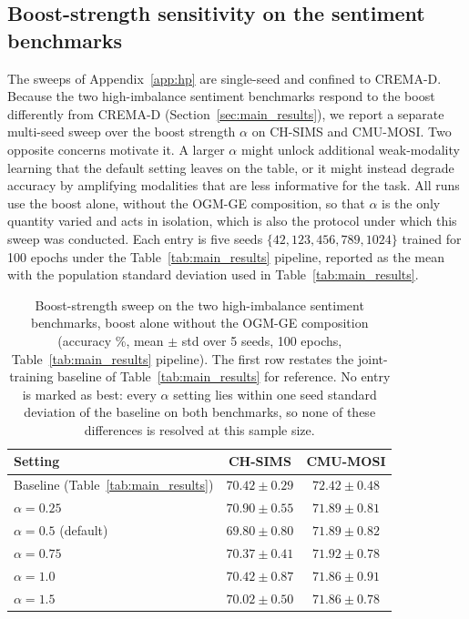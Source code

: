 \documentclass{article}
\begin{document}
\subsection{Boost-strength sensitivity on the sentiment benchmarks}
\label{app:alpha_sentiment}

The sweeps of Appendix~\ref{app:hp} are single-seed and confined to CREMA-D. Because the two high-imbalance sentiment benchmarks respond to the boost differently from CREMA-D (Section~\ref{sec:main_results}), we report a separate multi-seed sweep over the boost strength $\alpha$ on CH-SIMS and CMU-MOSI. Two opposite concerns motivate it. A larger $\alpha$ might unlock additional weak-modality learning that the default setting leaves on the table, or it might instead degrade accuracy by amplifying modalities that are less informative for the task. All runs use the boost alone, without the OGM-GE composition, so that $\alpha$ is the only quantity varied and acts in isolation, which is also the protocol under which this sweep was conducted. Each entry is five seeds $\{42, 123, 456, 789, 1024\}$ trained for 100 epochs under the Table~\ref{tab:main_results} pipeline, reported as the mean with the population standard deviation used in Table~\ref{tab:main_results}.

\begin{table}[H]
\centering
\caption{Boost-strength sweep on the two high-imbalance sentiment benchmarks, boost alone without the OGM-GE composition (accuracy \%, mean $\pm$ std over 5 seeds, 100 epochs, Table~\ref{tab:main_results} pipeline). The first row restates the joint-training baseline of Table~\ref{tab:main_results} for reference. No entry is marked as best: every $\alpha$ setting lies within one seed standard deviation of the baseline on both benchmarks, so none of these differences is resolved at this sample size.}
\label{tab:alpha_sentiment}
\vspace{0.3em}
\begin{tabular}{lcc}
\toprule
\textbf{Setting} & \textbf{CH-SIMS} & \textbf{CMU-MOSI} \\
\midrule
Baseline (Table~\ref{tab:main_results}) & $70.42 \pm 0.29$ & $72.42 \pm 0.48$ \\
\midrule
$\alpha = 0.25$           & $70.90 \pm 0.55$ & $71.89 \pm 0.81$ \\
$\alpha = 0.5$ (default)  & $69.80 \pm 0.80$ & $71.89 \pm 0.82$ \\
$\alpha = 0.75$           & $70.37 \pm 0.41$ & $71.92 \pm 0.78$ \\
$\alpha = 1.0$            & $70.42 \pm 0.87$ & $71.86 \pm 0.91$ \\
$\alpha = 1.5$            & $70.02 \pm 0.50$ & $71.86 \pm 0.78$ \\
\bottomrule
\end{tabular}
\end{table}
\end{document}
